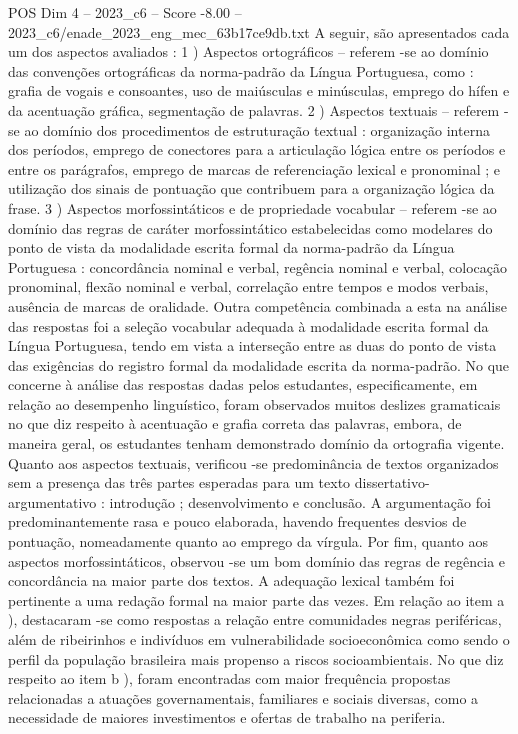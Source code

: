\begin{textsample}{POS Dim 4 – 2023\_c6 – Score -8.00 – 2023\_c6/enade\_2023\_eng\_mec\_63b17ce9db.txt}
A seguir, são apresentados cada um dos aspectos avaliados : 1 ) Aspectos ortográficos – referem -se ao domínio das convenções ortográficas da norma-padrão da Língua Portuguesa, como : grafia de vogais e consoantes, uso de maiúsculas e minúsculas, emprego do hífen e da acentuação gráfica, segmentação de palavras. 2 ) Aspectos textuais – referem -se ao domínio dos procedimentos de estruturação textual : organização interna dos períodos, emprego de conectores para a articulação lógica entre os períodos e entre os parágrafos, emprego de marcas de referenciação lexical e pronominal ; e utilização dos sinais de pontuação que contribuem para a organização lógica da frase. 3 ) Aspectos morfossintáticos e de propriedade vocabular – referem -se ao domínio das regras de caráter morfossintático estabelecidas como modelares do ponto de vista da modalidade escrita formal da norma-padrão da Língua Portuguesa : concordância nominal e verbal, regência nominal e verbal, colocação pronominal, flexão nominal e verbal, correlação entre tempos e modos verbais, ausência de marcas de oralidade.
Outra competência combinada a esta na análise das respostas foi a seleção vocabular adequada à modalidade escrita formal da Língua Portuguesa, tendo em vista a interseção entre as duas do ponto de vista das exigências do registro formal da modalidade escrita da norma-padrão.
No que concerne à análise das respostas dadas pelos estudantes, especificamente, em relação ao desempenho linguístico, foram observados muitos deslizes gramaticais no que diz respeito à acentuação e grafia correta das palavras, embora, de maneira geral, os estudantes tenham demonstrado domínio da ortografia vigente.
Quanto aos aspectos textuais, verificou -se predominância de textos organizados sem a presença das três partes esperadas para um texto dissertativo-argumentativo : introdução ; desenvolvimento e conclusão.
A argumentação foi predominantemente rasa e pouco elaborada, havendo frequentes desvios de pontuação, nomeadamente quanto ao emprego da vírgula.
Por fim, quanto aos aspectos morfossintáticos, observou -se um bom domínio das regras de regência e concordância na maior parte dos textos.
A adequação lexical também foi pertinente a uma redação formal na maior parte das vezes.
Em relação ao item a ), destacaram -se como respostas a relação entre comunidades negras periféricas, além de ribeirinhos e indivíduos em vulnerabilidade socioeconômica como sendo o perfil da população brasileira mais propenso a riscos socioambientais.
No que diz respeito ao item b ), foram encontradas com maior frequência propostas relacionadas a atuações governamentais, familiares e sociais diversas, como a necessidade de maiores investimentos e ofertas de trabalho na periferia.

\end{textsample}
